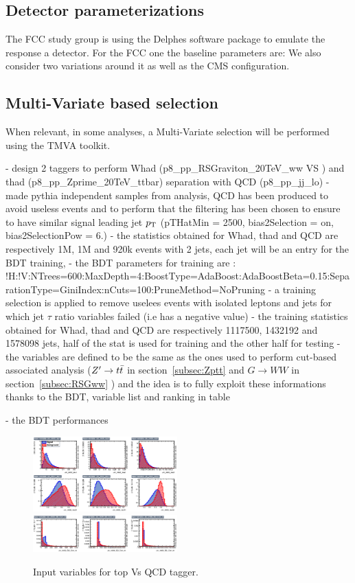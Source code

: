 \documentclass{cernrep}
\begin{document}
\subsection{Detector parameterizations}
The FCC study group is using the Delphes software package to emulate the response a detector. 
For the FCC one the baseline parameters are:
We also consider two variations around it as well as the CMS configuration.


\subsection{Multi-Variate based selection}
When relevant, in some analyses, a Multi-Variate selection will be performed using the TMVA toolkit.

- design 2 taggers to perform Whad (p8\_pp\_RSGraviton\_20TeV\_ww VS ) and thad (p8\_pp\_Zprime\_20TeV\_ttbar) separation with QCD (p8\_pp\_jj\_lo)
- made pythia independent samples from analysis, QCD has been produced to avoid useless events and to perform that the filtering has been chosen to ensure to have similar signal leading jet $p\sb{\scriptstyle\mathrm{T}}$ (pTHatMin = 2500, bias2Selection = on, bias2SelectionPow = 6.)
- the statistics obtained for Whad, thad and QCD are respectively 1M, 1M and 920k events with 2 jets, each jet will be an entry for the BDT training,
- the BDT parameters for training are : !H:!V:NTrees=600:MaxDepth=4:BoostType=AdaBoost:AdaBoostBeta=0.15:SeparationType=GiniIndex:nCuts=100:PruneMethod=NoPruning
- a training selection is applied to remove uselees events with isolated leptons and jets for which jet $\tau$ ratio variables failed (i.e has a negative value)
- the training statistics obtained for Whad, thad and QCD are respectively 1117500, 1432192 and 1578098 jets, half of the stat is used for training and the other half for testing
- the variables are defined to be the same as the ones used to perform cut-based associated analysis ($Z^{\prime} \rightarrow t\bar{t}$ in section~\ref{subsec:Zptt} and $G \rightarrow WW$ in section~\ref{subsec:RSGww} ) and the idea is to fully exploit these informations thanks to the BDT, variable list and ranking in table

- the BDT performances 

\begin{figure}[!htb]\centering
\includegraphics[width=0.495\textwidth]{Fig/TMVA/thad_vs_QCD/variables_id_c1.eps}
\includegraphics[width=0.495\textwidth]{Fig/TMVA/thad_vs_QCD/variables_id_c2.eps}
\caption{Input variables for top Vs QCD tagger.}
\label{fig:TMVA_inputs_t}
\end{figure}
\end{document}
